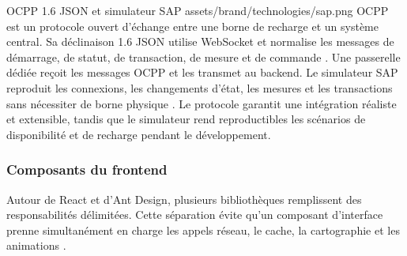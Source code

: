 \TechnologyProfile
  {OCPP 1.6 JSON et simulateur SAP}
  {assets/brand/technologies/sap.png}
  {OCPP est un protocole ouvert d'échange entre une borne de recharge et un
  système central. Sa déclinaison 1.6 JSON utilise WebSocket et normalise les
  messages de démarrage, de statut, de transaction, de mesure et de commande
  \cite{ocaOcpp16}.}
  {Une passerelle dédiée reçoit les messages OCPP et les transmet au backend.
  Le simulateur SAP reproduit les connexions, les changements d'état, les
  mesures et les transactions sans nécessiter de borne physique
  \cite{sapSimulator}.}
  {Le protocole garantit une intégration réaliste et extensible, tandis que le
  simulateur rend reproductibles les scénarios de disponibilité et de recharge
  pendant le développement.}

\subsubsection*{Composants du frontend}

Autour de React et d'Ant Design, plusieurs bibliothèques remplissent des
responsabilités délimitées. Cette séparation évite qu'un composant d'interface
prenne simultanément en charge les appels réseau, le cache, la cartographie et
les animations \cite{vite,tanstackQuery,axios,zustand,leaflet,recharts,gsap}.

